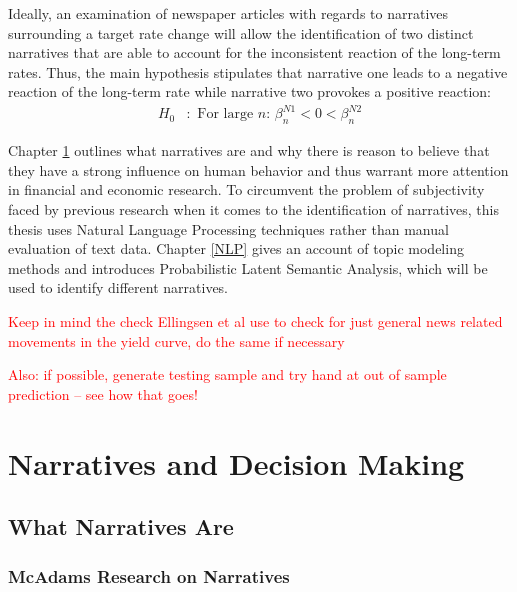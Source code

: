 \documentclass[11pt,a4paper,english,oneside]{book}
\numberwithin{equation}{chapter}
\begin{document}
Ideally, an examination of newspaper articles with regards to narratives surrounding a target rate change will allow the identification of two distinct narratives that are able to account for the inconsistent reaction of the long-term rates. Thus, the main hypothesis stipulates that narrative one leads to a negative reaction of the long-term rate while narrative two provokes a positive reaction:
\begin{align}\label{H00}
H_0&:  \text{ For large $n$: } \beta_n^{N1}<0< \beta_n^{N2}
\end{align}

Chapter \ref{NarrativesAndDecisionMaking} outlines what narratives are and why there is reason to believe that they have a strong influence on human behavior and thus warrant more attention in financial and economic research. To circumvent the problem of subjectivity faced by previous research when it comes to the identification of narratives, this thesis uses Natural Language Processing techniques rather than manual evaluation of text data. Chapter \ref{NLP} gives an account of topic modeling methods and introduces Probabilistic Latent Semantic Analysis, which will be used to identify different narratives. 

\textcolor{red}{Keep in mind the check Ellingsen et al use to check for just general news related movements in the yield curve, do the same if necessary}

\textcolor{red}{Also: if possible, generate testing sample and try hand at out of sample prediction -- see how that goes!}


\chapter{Narratives and Decision Making}\label{NarrativesAndDecisionMaking}


\section{What Narratives Are}

\subsection{McAdams Research on Narratives}
\end{document}
